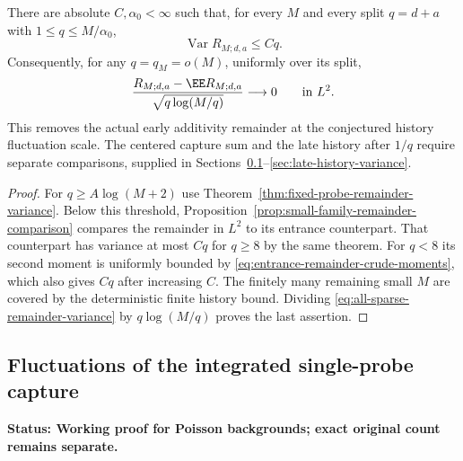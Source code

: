 \documentclass[11pt,letterpaper]{article}
\newcommand{\status}[1]{\textbf{Status: #1.}}
\begin{document}
\begin{corollary}
\label{cor:all-sparse-remainder-variance}
There are absolute $C,\alpha_0<\infty$ such that, for every
$M$ and every split $q=d+a$ with $1\le q\le M/\alpha_0$,
\begin{equation}\label{eq:all-sparse-remainder-variance}
 \operatorname{Var}R_{M;d,a}\le Cq.
\end{equation}
Consequently, for any $q=q_M=o(M)$, uniformly over its split,
\[
 \frac{R_{M;d,a}-\EE R_{M;d,a}}
           {\sqrt{q\log(M/q)}}\longrightarrow0
                              \qquad\hbox{in }L^2.
\]
This removes the actual early additivity remainder at the
conjectured history fluctuation scale. The centered capture
sum and the late history after $1/q$ require separate comparisons,
supplied in Sections~\ref{sec:integrated-capture-fluctuations}--\ref{sec:late-history-variance}.
\end{corollary}
\begin{proof}
For $q\ge A\log(M+2)$ use
Theorem~\ref{thm:fixed-probe-remainder-variance}. Below this
threshold, Proposition~\ref{prop:small-family-remainder-comparison}
compares the remainder in $L^2$ to its entrance counterpart.
That counterpart has variance at most $Cq$ for $q\ge8$ by
the same theorem. For $q<8$ its second moment is uniformly
bounded by \eqref{eq:entrance-remainder-crude-moments}, which
also gives $Cq$ after increasing $C$. The finitely many
remaining small $M$ are covered by the deterministic finite
history bound. Dividing \eqref{eq:all-sparse-remainder-variance}
by $q\log(M/q)$ proves the last assertion.
\end{proof}

\subsection{Fluctuations of the integrated single-probe capture}
\label{sec:integrated-capture-fluctuations}

\status{Working proof for Poisson backgrounds; exact original count remains separate}
\end{document}
